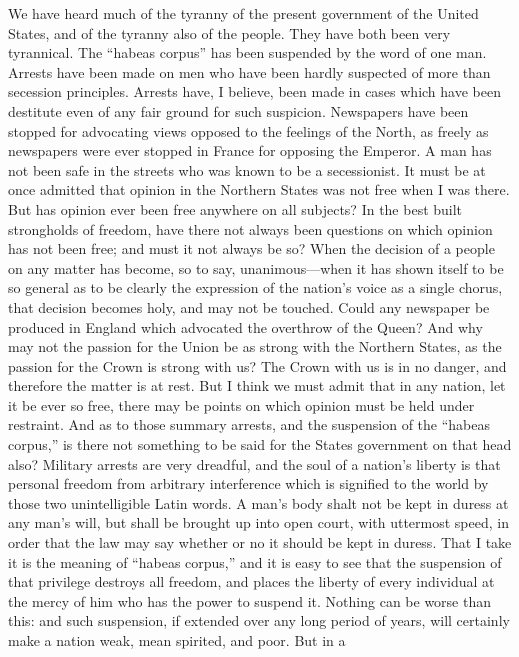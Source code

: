 We have heard much of the tyranny of the present government of the
United States, and of the tyranny also of the people.  They have
both been very tyrannical.  The ``habeas corpus'' has been suspended
by the word of one man.  Arrests have been made on men who have
been hardly suspected of more than secession principles.  Arrests
have, I believe, been made in cases which have been destitute even
of any fair ground for such suspicion.  Newspapers have been
stopped for advocating views opposed to the feelings of the North,
as freely as newspapers were ever stopped in France for opposing
the Emperor.  A man has not been safe in the streets who was known
to be a secessionist.  It must be at once admitted that opinion in
the Northern States was not free when I was there.  But has opinion
ever been free anywhere on all subjects?  In the best built
strongholds of freedom, have there not always been questions on
which opinion has not been free; and must it not always be so?
When the decision of a people on any matter has become, so to say,
unanimous---when it has shown itself to be so general as to be
clearly the expression of the nation's voice as a single chorus,
that decision becomes holy, and may not be touched.  Could any
newspaper be produced in England which advocated the overthrow of
the Queen?  And why may not the passion for the Union be as strong
with the Northern States, as the passion for the Crown is strong
with us?  The Crown with us is in no danger, and therefore the
matter is at rest.  But I think we must admit that in any nation,
let it be ever so free, there may be points on which opinion must
be held under restraint.  And as to those summary arrests, and the
suspension of the ``habeas corpus,'' is there not something to be
said for the States government on that head also?  Military arrests
are very dreadful, and the soul of a nation's liberty is that
personal freedom from arbitrary interference which is signified to
the world by those two unintelligible Latin words.  A man's body
shalt not be kept in duress at any man's will, but shall be brought
up into open court, with uttermost speed, in order that the law may
say whether or no it should be kept in duress.  That I take it is
the meaning of ``habeas corpus,'' and it is easy to see that the
suspension of that privilege destroys all freedom, and places the
liberty of every individual at the mercy of him who has the power
to suspend it.  Nothing can be worse than this: and such
suspension, if extended over any long period of years, will
certainly make a nation weak, mean spirited, and poor.  But in a
